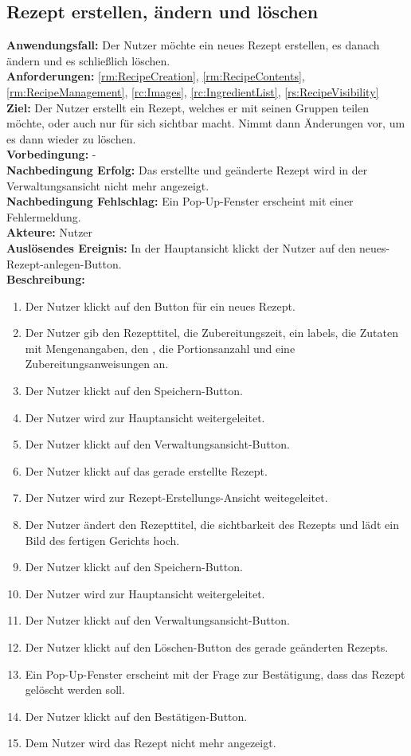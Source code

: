 \documentclass[parskip=full]{scrartcl}
\begin{document}
\subsection{Rezept erstellen, ändern und löschen}
\textbf{Anwendungsfall:} Der Nutzer möchte ein neues Rezept erstellen, es danach ändern und es schließlich löschen.\\
\textbf{Anforderungen:} \ref{rm:RecipeCreation}, \ref{rm:RecipeContents}, \ref{rm:RecipeManagement}, \ref{rc:Images}, \ref{rc:IngredientList}, \ref{rs:RecipeVisibility}\\
\textbf{Ziel:} Der Nutzer erstellt ein Rezept, welches er mit seinen Gruppen teilen möchte, oder auch nur für sich sichtbar macht. Nimmt dann Änderungen vor, um es dann wieder zu löschen.\\
\textbf{Vorbedingung:} -\\
\textbf{Nachbedingung Erfolg:} Das erstellte und geänderte Rezept wird in der Verwaltungsansicht nicht mehr angezeigt.  \\
\textbf{Nachbedingung Fehlschlag:} Ein Pop-Up-Fenster erscheint mit einer Fehlermeldung.\\
\textbf{Akteure:} Nutzer\\
\textbf{Auslösendes Ereignis:} In der Hauptansicht klickt der Nutzer auf den neues-Rezept-anlegen-Button.\\
\textbf{Beschreibung:}
\begin{enumerate}
    \item Der Nutzer klickt auf den Button für ein neues Rezept.
    \item Der Nutzer gib den Rezepttitel, die Zubereitungszeit, ein \gls{labels}, die Zutaten mit Mengenangaben, den , die Portionsanzahl und eine Zubereitungsanweisungen an.
    \item Der Nutzer klickt auf den Speichern-Button.
    \item Der Nutzer wird zur Hauptansicht weitergeleitet.
    \item Der Nutzer klickt auf den Verwaltungsansicht-Button.
    \item Der Nutzer klickt auf das gerade erstellte Rezept.
    \item Der Nutzer wird zur Rezept-Erstellungs-Ansicht weitegeleitet.
    \item Der Nutzer ändert den Rezepttitel, die \gls{sichtbarkeit} des Rezepts und lädt ein Bild des fertigen Gerichts hoch.
    \item Der Nutzer klickt auf den Speichern-Button.
    \item Der Nutzer wird zur Hauptansicht weitergeleitet.
    \item Der Nutzer klickt auf den Verwaltungsansicht-Button.
    \item Der Nutzer klickt auf den Löschen-Button des gerade geänderten Rezepts.
    \item Ein Pop-Up-Fenster erscheint mit der Frage zur Bestätigung, dass das Rezept gelöscht werden soll.
    \item Der Nutzer klickt auf den Bestätigen-Button.
    \item Dem Nutzer wird das Rezept nicht mehr angezeigt.
\end{enumerate}
\end{document}

